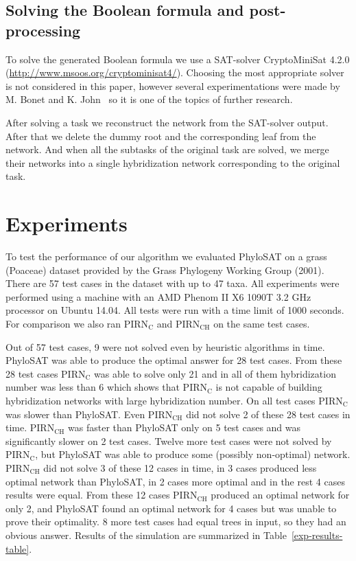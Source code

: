 \documentclass[runningheads, envcountsame, a4paper]{llncs}
\begin{document}
\subsection{Solving the Boolean formula and post-processing}

To solve the generated Boolean formula we use a SAT-solver CryptoMiniSat 4.2.0 (\url{http://www.msoos.org/cryptominisat4/}).
Choosing the most appropriate solver is not considered in this paper, however several experimentations were made by 
M. Bonet and K. John~\cite{bonet2009efficiently} so it is one of the topics of further research.

After solving a task we reconstruct the network from the SAT-solver output. After that we delete the dummy root and the corresponding 
leaf from the network. And when all the subtasks of the original task are solved, we merge their networks into a single 
hybridization network corresponding to the original task.

\section{Experiments}

To test the performance of our algorithm we evaluated PhyloSAT on a grass (Poaceae) dataset provided by the Grass Phylogeny Working Group (2001). There are 57 test cases in the dataset with up to 47 taxa. All experiments were performed using a machine with an AMD Phenom II X6 1090T 3.2 GHz 
processor on Ubuntu 14.04. All tests were run with a time limit of 1000 seconds. For comparison we also ran PIRN$\mathrm{_C}$ and PIRN$\mathrm{_{CH}}$ 
on the same test cases. 

Out of 57 test cases, 9 were not solved even by heuristic algorithms in time. PhyloSAT was able to produce the optimal answer for 28
test cases. From these 28 test cases PIRN$\mathrm{_C}$ was able to solve only 21 and in all of them hybridization number was less than 6
which shows that PIRN$\mathrm{_C}$ is not capable of building hybridization networks with large hybridization number.
On all test cases PIRN$\mathrm{_C}$ was slower than PhyloSAT.
Even PIRN$\mathrm{_{CH}}$ did not solve 2 of these 28 test cases in time. PIRN$\mathrm{_{CH}}$ was faster than PhyloSAT only
on 5 test cases and was significantly slower on 2 test cases. Twelve more test cases were not solved by PIRN$\mathrm{_C}$, but PhyloSAT
was able to produce some (possibly non-optimal) network. PIRN$\mathrm{_{CH}}$ did not solve 3 of these 12 cases in time, in 3 cases 
produced less optimal network than PhyloSAT, in 2 cases more optimal and in the rest 4 cases results were equal. From these 12 cases PIRN$\mathrm{_{CH}}$
produced an optimal network for only 2, and PhyloSAT found an optimal network for 4 cases but was unable to prove their optimality. 
8 more test cases had equal trees in input, so they had an obvious answer.
Results of the simulation are summarized in Table~\ref{exp-results-table}.
\end{document}
